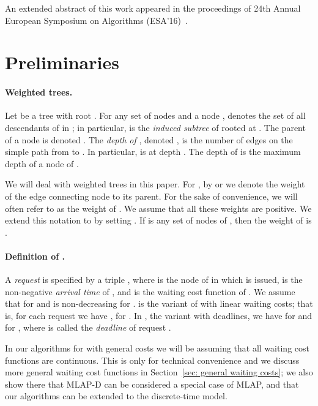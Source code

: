 \documentclass[a4paper]{article}
\newcommand{\MLAP}{\mbox{\rm\textsf{MLAP}}}
\newcommand{\MLAPD}{\mbox{\rm\textsf{MLAP-D}}}
\begin{document}
An extended abstract of this work appeared in the proceedings of  
24th Annual European Symposium on Algorithms (ESA'16)~\cite{Bienkowski_etal_multilevel_esa_2016}.


\section{Preliminaries}
\label{sec: preliminaries}

\paragraph{Weighted trees.}

Let  be a tree with root .
For any set of nodes  and a node ,  denotes
the set of all descendants of  in ; in particular,  is 
the \emph{induced subtree} of  rooted at .
The parent of a node  is denoted .
The \emph{depth of }, denoted , is
the number of edges on the simple path from  to . In
particular,  is at depth . The depth  of  is the
maximum depth of a node of .

We will deal with weighted trees in this paper. For , by
 or  we denote the weight of the edge
connecting node  to its parent. For the sake of convenience,
we will often refer to  as the weight of .
We assume that all these weights
are positive. We extend this notation to  by setting .
If  is any set of nodes of , then the weight of  is
.


\paragraph{Definition of .}

A \emph{request}  is specified by a triple , where  is the
node of  in which  is issued,  is the non-negative
\emph{arrival time} of , and  is the waiting cost
function of . We assume that  for  and  is non-decreasing for . 
 is the variant of  with linear waiting costs; that is,
for each request  we have
, for .
In , the variant with deadlines,
we have  for  and
 for , where  is called
the \emph{deadline} of request .

In our algorithms for  with general costs we will be assuming that 
all waiting cost functions are continuous.
This is only for technical convenience and we discuss more general waiting cost
functions in Section~\ref{sec: general waiting costs};
we also show there that {\MLAPD} can be considered a special case of {\MLAP},
and that our algorithms can be extended to the discrete-time model.
\end{document}
